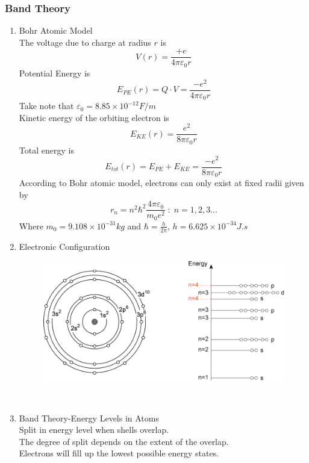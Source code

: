 \documentclass{article}
\begin{document}
\subsubsection{Band Theory}
\begin{enumerate}
    \item Bohr Atomic Model \\
    The voltage due to charge at radius $r$ is 
    \[V(r) = \frac{+e}{4\pi \varepsilon_0 r}\]
    Potential Energy is
    \[E_{PE}(r) = Q\cdot V = \frac{-e^2}{4\pi \varepsilon_0 r}\]
    Take note that $\varepsilon_0 = 8.85\times 10^{-12} F/m$ \\
    Kinetic energy of the orbiting electron is 
    \[E_{KE}(r) = \frac{e^2}{8\pi \varepsilon_0 r}\]
    Total energy is 
    \[E_{tot}(r) = E_{PE}+E_{KE} = \frac{-e^2}{8\pi \varepsilon_0 r}\]
    According to Bohr atomic model, electrons can only exist at fixed radii given by 
    \begin{equation}
        r_n = n^2 \hbar^2 \frac{4\pi \varepsilon_0}{m_0 e^2}\; :\; n = 1,2,3\ldots 
    \end{equation}
    Where $m_0 = 9.108\times 10^{-31} kg$ and $\hbar = \frac{h}{2\pi}$, $h = 6.625\times 10^{-34} J.s$
    \item Electronic Configuration \\
    \begin{figure}[h]
        \centering
        \includegraphics[width=0.75\linewidth]{image/eleconifg.png}
    \end{figure}
     \\
    \item Band Theory-Energy Levels in Atoms \\
    Split in energy level when shells overlap. \\
    The degree of split depends on the extent of the overlap. \\
    Electrons will fill up the lowest possible energy states. \\
      \\
    \begin{minipage}{0.5\textwidth}

\end{minipage}
\end{enumerate}
\end{document}
